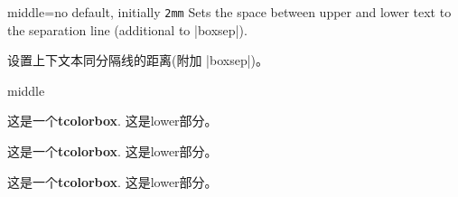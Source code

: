 \begin{docTcbKey}{middle}{=}{no default, initially \texttt{2mm}}
Sets the space between upper and lower text to the separation line
(additional to |boxsep|).


设置上下文本同分隔线的距离(附加 |boxsep|)。
\begin{exdispExample}{middle}

\begin{tcolorbox}[middle=0mm,boxsep=0mm]
这是一个\textbf{tcolorbox}.
\tcblower
这是lower部分。
\end{tcolorbox}
\begin{tcolorbox}[boxsep=0mm]
这是一个\textbf{tcolorbox}.
\tcblower
这是lower部分。
\end{tcolorbox}
\begin{tcolorbox}
这是一个\textbf{tcolorbox}.
\tcblower
这是lower部分。
\end{tcolorbox}
\end{exdispExample}
\end{docTcbKey}

